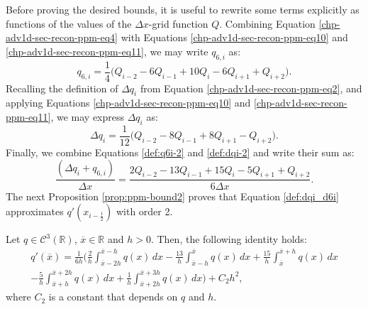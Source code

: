 Before proving the desired bounds, it is useful to rewrite some terms
explicitly as functions of the values of the $\Delta x$-grid function $Q$.
Combining Equation \eqref{chp-adv1d-sec-recon-ppm-eq4} with Equations
\eqref{chp-adv1d-sec-recon-ppm-eq10} and \eqref{chp-adv1d-sec-recon-ppm-eq11}, 
we may write $q_{6,i}$ as:
\begin{equation}
	\label{def:q6i-2}
	q_{6,i} = \frac{1}{4} \bigg( Q_{i-2} - 6Q_{i-1} + 10Q_{i} -6Q_{i+1}  + Q_{i+2} \bigg).
\end{equation}
Recalling the definition of $\Delta q_i$ from Equation \eqref{chp-adv1d-sec-recon-ppm-eq2},
and applying Equations \eqref{chp-adv1d-sec-recon-ppm-eq10} and \eqref{chp-adv1d-sec-recon-ppm-eq11}, 
we may express $\Delta q_i$ as:
\begin{equation}
	\label{def:dqi-2}
	\Delta q_i = \frac{1}{12} \bigg(Q_{i-2} -8Q_{i-1} + 8Q_{i+1} -Q_{i+2} \bigg).
\end{equation}
Finally, we combine Equations \eqref{def:q6i-2} and \eqref{def:dqi-2} and write their sum as:
\begin{equation} 
	\label{def:dqi_d6i}
	\frac{(\Delta q_i + q_{6, i})}{\Delta x} = 
	\frac{2Q_{i-2}-13Q_{i-1} +15Q_i -5Q_{i+1} + Q_{i+2}}{6\Delta x}.
\end{equation}
The next Proposition \ref{prop:ppm-bound2} proves that Equation \eqref{def:dqi_d6i}
approximates $q'(x_{i-\frac{1}{2}})$ with order 2.
\begin{prop}
	\label{prop:ppm-bound2}
	Let $q \in \mathcal{C}^{3}(\mathbb{R})$, $\overline{x}\in \mathbb{R}$ and $h>0$.
	Then, the following identity holds:
	\begin{equation}
		\begin{split}
			\label{prop:ppm-bound2-eq1}
			q'(\overline{x} ) = \frac{1}{6h}
			\bigg( \frac{2}{h} \int_{\overline{x}-2h}^{\overline{x}-h} q(x) \,dx 
			-\frac{13}{h}\int_{\overline{x}-h}^{\overline{x}} q(x) \,dx   
			+\frac{15}{h}\int_{\overline{x}}^{\overline{x}+h} q(x) \,dx  \\ 
			-\frac{5}{h} \int_{\overline{x}+h}^{\overline{x}+2h} q(x) \,dx   
			+\frac{1}{h} \int_{\overline{x}+2h}^{\overline{x}+3h} q(x) \,dx   
			\bigg) + C_2h^2,
		\end{split}
	\end{equation}
	where $C_2$ is a constant that depends on $q$ and $h$.
\end{prop}

